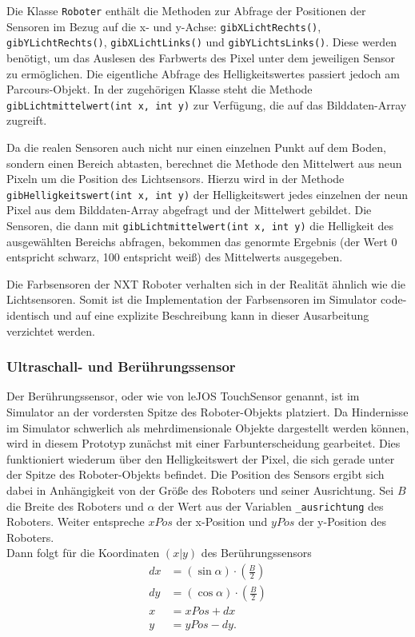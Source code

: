 \documentclass[paper=a4, DIV=calc, BCOR=15mm, twoside=on, onecolumn=on, open = right, titlepage =on, parskip =half, headsepline = on, footsepline = on, chapterprefix = off, appendixprefix = off, fontsize = 12pt, numbers = noenddot, abstract = on]{scrbook}
\begin{document}
Die Klasse \texttt{Roboter} enthält die Methoden zur Abfrage der Positionen der Sensoren im Bezug auf die x- und y-Achse: \texttt{gib\-X\-Licht\-Rechts()}, \texttt{gib\-Y\-Licht\-Rechts()}, \texttt{gib\-X\-Licht\-Links()} und \texttt{gibYLichtsLinks()}. Diese werden benötigt, um das Auslesen des Farbwerts des Pixel unter dem jeweiligen Sensor zu ermöglichen. Die eigentliche Abfrage des Helligkeitswertes passiert jedoch am Parcours-Objekt. In der zugehörigen Klasse steht die Methode \texttt{gibLichtmittelwert(int x, int y)} zur Verfügung, die auf das Bilddaten-Array zugreift.

Da die realen Sensoren auch nicht nur einen einzelnen Punkt auf dem Boden, sondern einen Bereich abtasten, berechnet die Methode den Mittelwert aus neun Pixeln um die Position des Lichtsensors. Hierzu wird in der Methode \texttt{gib\-Hellig\-keits\-wert(int x, int y)} der Helligkeitswert jedes einzelnen der neun Pixel aus dem Bilddaten-Array abgefragt und der Mittelwert gebildet. Die Sensoren, die dann mit \texttt{gib\-Licht\-mittel\-wert(int x, int y)} die Helligkeit des ausgewählten Bereichs abfragen, bekommen das genormte Ergebnis (der Wert 0 entspricht schwarz, 100 entspricht weiß) des Mittelwerts ausgegeben.

Die Farbsensoren der NXT Roboter verhalten sich in der Realität ähnlich wie die Lichtsensoren. Somit ist die Implementation der Farbsensoren im Simulator code-identisch und auf eine explizite Beschreibung kann in dieser Ausarbeitung verzichtet werden.

\subsubsection{Ultraschall- und Berührungssensor}
Der Berührungssensor, oder wie von leJOS TouchSensor genannt, ist im Simulator an der vordersten Spitze des Roboter-Objekts platziert. Da Hindernisse im Simulator schwerlich als mehrdimensionale Objekte dargestellt werden können, wird in diesem Prototyp zunächst mit einer Farbunterscheidung gearbeitet. Dies funktioniert wiederum über den Helligkeitswert der Pixel, die sich gerade unter der Spitze des Roboter-Objekts befindet. Die Position des Sensors ergibt sich dabei in Anhängigkeit von der Größe des Roboters und seiner Ausrichtung. Sei $B$ die Breite des Roboters und $\alpha$ der Wert aus der Variablen \texttt{{\_}ausrichtung} des Roboters. Weiter entspreche $xPos$ der x-Position und $yPos$ der y-Position des Roboters.\\
Dann folgt für die Koordinaten $\left( x \vert y \right)$ des Berührungssensors
\begin{align*}
dx & = \left( \sin \alpha \right) \cdot \left( \frac{B}{2} \right)\\
dy & = \left( \cos \alpha \right) \cdot \left( \frac{B}{2} \right)\\
 x & = xPos + dx\\
 y & = yPos - dy.
\end{align*}
\end{document}
